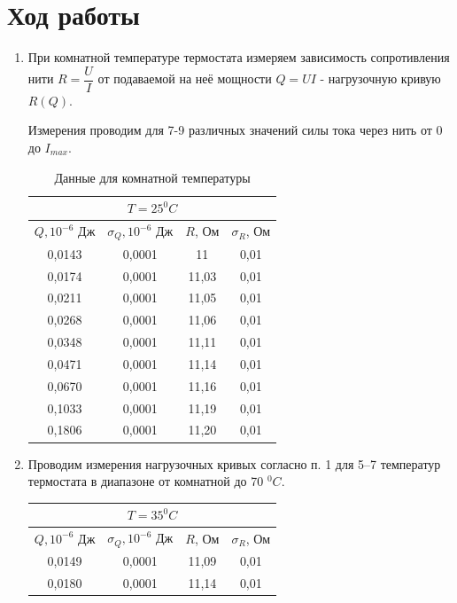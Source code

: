\documentclass[a4paper, 12pt]{article}%
\begin{document}
\section*{Ход работы}
\begin{enumerate}
\item При комнатной температуре термостата измеряем зависимость сопротивления нити $R =\dfrac{U}{I}$ от подаваемой на неё мощности $Q = UI$ - нагрузочную кривую $R(Q)$.

Измерения проводим для 7-9 различных значений силы тока через нить от 0 до $I_{max}$.
\begin{table}[h]
\begin{center}
\begin{tabular}{|c|c|c|c|}
\hline
\multicolumn{4}{|c|}{$T = 25 ^0 C$} \\ \hline
$Q, 10^{-6}$ Дж & $\sigma_Q, 10^{-6}$ Дж & $R$, Ом & $\sigma_R$, Ом \\ \hline
0,0143 & 0,0001 & 11 & 0,01 \\ \hline
0,0174 & 0,0001 & 11,03 & 0,01 \\ \hline
0,0211 & 0,0001 & 11,05 & 0,01 \\ \hline
0,0268 & 0,0001 & 11,06 & 0,01 \\ \hline
0,0348 & 0,0001 & 11,11 & 0,01 \\ \hline
0,0471 & 0,0001 & 11,14 & 0,01 \\ \hline
0,0670 & 0,0001 & 11,16 & 0,01 \\ \hline
0,1033 & 0,0001 & 11,19 & 0,01 \\ \hline
0,1806 & 0,0001 & 11,20 & 0,01 \\ \hline
\end{tabular}
\end{center}
\caption{Данные для комнатной температуры}
\end{table} 
\item Проводим измерения нагрузочных кривых согласно п. 1 для 5–7 температур термостата в диапазоне от комнатной до 70 $^0 C$.
\begin{table}[h]
\begin{center}
\begin{tabular}{|c|c|c|c|}
\hline
\multicolumn{4}{|c|}{$T = 35 ^0 C$} \\ \hline
$Q, 10^{-6}$ Дж & $\sigma_Q, 10^{-6}$ Дж & $R$, Ом & $\sigma_R$, Ом \\ \hline
0,0149 & 0,0001 & 11,09 & 0,01 \\ \hline
0,0180 & 0,0001 & 11,14 & 0,01 \\ \hline

\end{tabular}
\end{center}
\end{table}
\end{enumerate}
\end{document}
